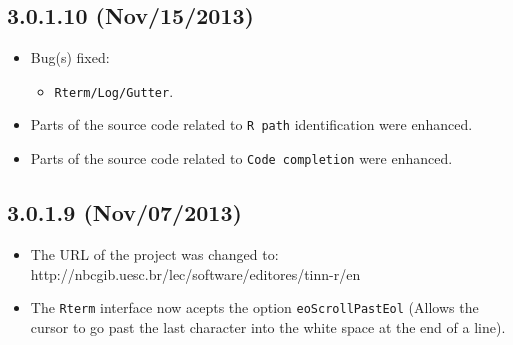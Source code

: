 \subsection{3.0.1.10 (Nov/15/2013)}
\begin{itemize}
  \item Bug(s) fixed:
    \begin{itemize}
      \item \texttt{Rterm/Log/Gutter}.
    \end{itemize}
  \item Parts of the source code related to \texttt{R path} identification were enhanced.
  \item Parts of the source code related to \texttt{Code completion} were enhanced.
\end{itemize}

\subsection{3.0.1.9 (Nov/07/2013)}
\begin{itemize}
  \item The URL of the project was changed to: http://nbcgib.uesc.br/lec/software/editores/tinn-r/en
  \item The \texttt{Rterm} interface now acepts the option \texttt{eoScrollPastEol}
   (Allows the cursor to go past the last character into the white space at the end of a line).
\end{itemize}

